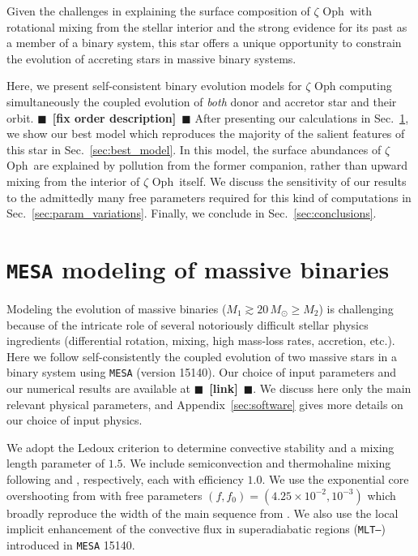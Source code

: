 \documentclass[twocolumn,twocolappendix,trackchanges]{aastex63}
\DeclareRobustCommand{\Secref}[1]{Sec.~\ref{#1}}
\newcommand{\zoph}{$\zeta$ Oph}
\newcommand{\todo}[1]{{\large $\blacksquare$~\textbf{\color{red}[#1]}}~$\blacksquare$}
\begin{document}
Given the challenges in explaining the surface composition of \zoph\
with rotational mixing from the stellar interior and the strong
evidence for its past as a member of a binary system, this star offers
a unique opportunity to constrain the evolution of accreting stars in
massive binary systems.

Here, we present self-consistent binary evolution models for
$\zeta$ Oph computing simultaneously the coupled evolution of
\emph{both} donor and accretor star and their orbit. \todo{fix order description} After presenting
our calculations in \Secref{sec:methods}, we show our best model which
reproduces the majority of the salient features of this star in
\Secref{sec:best_model}. In this model, the surface abundances of
\zoph\ are explained by pollution from the former companion, rather
than upward mixing from the interior of \zoph\ itself. We discuss the
sensitivity of our results to the admittedly many free parameters
required for this kind of computations in
\Secref{sec:param_variations}. Finally, we conclude in
\Secref{sec:conclusions}.



\section{ \texttt{MESA} modeling of massive binaries}
\label{sec:methods}

Modeling the evolution of massive binaries
($M_1\gtrsim 20\,M_\odot \geq M_2$) is challenging because of the
intricate role of several notoriously difficult stellar physics
ingredients (differential rotation, mixing, high mass-loss rates,
accretion, etc.). Here we follow self-consistently the coupled
evolution of two massive stars in a binary system using \texttt{MESA}
(version 15140). Our choice of input parameters and our numerical
results are available at \todo{link}. We discuss here only the main
relevant physical parameters, and Appendix~\ref{sec:software} gives
more details on our choice of input physics.

We adopt the Ledoux criterion to determine convective stability and a
mixing length parameter of $1.5$. We include semiconvection and
thermohaline mixing following \cite{langer:83} and
\cite{kippenhahn:80}, respectively, each with efficiency $1.0$. We use the exponential core overshooting from \cite{herwig:00}
with free parameters $(f, f_0)=(4.25\times10^{-2}, 10^{-3})$
\citep{claret:17} which broadly reproduce the width of the main
sequence from \cite{brott:11}. We also use the local implicit
enhancement of the convective flux in superadiabatic regions
(\texttt{MLT--}) introduced in \texttt{MESA}
15140.
\end{document}
